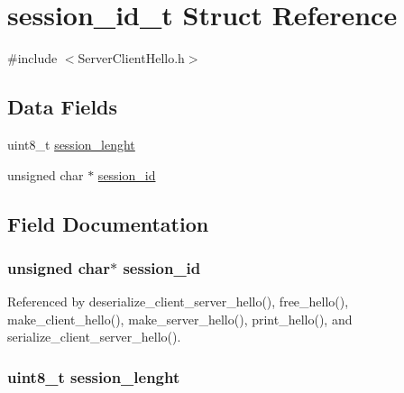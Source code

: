 \hypertarget{structsession__id__t}{}\section{session\+\_\+id\+\_\+t Struct Reference}
\label{structsession__id__t}


{\ttfamily \#include $<$Server\+Client\+Hello.\+h$>$}

\subsection*{Data Fields}
\begin{DoxyCompactItemize}
\item 
uint8\+\_\+t \hyperlink{structsession__id__t_a9215daa8dba2536b15b9029e18017c3a}{session\+\_\+lenght}
\item 
unsigned char $\ast$ \hyperlink{structsession__id__t_a16b10327d41aa891822609659111d1a1}{session\+\_\+id}
\end{DoxyCompactItemize}


\subsection{Field Documentation}
\subsubsection[{\texorpdfstring{session\+\_\+id}{session_id}}]{\setlength{\rightskip}{0pt plus 5cm}unsigned char$\ast$ session\+\_\+id}\hypertarget{structsession__id__t_a16b10327d41aa891822609659111d1a1}{}\label{structsession__id__t_a16b10327d41aa891822609659111d1a1}


Referenced by deserialize\+\_\+client\+\_\+server\+\_\+hello(), free\+\_\+hello(), make\+\_\+client\+\_\+hello(), make\+\_\+server\+\_\+hello(), print\+\_\+hello(), and serialize\+\_\+client\+\_\+server\+\_\+hello().

\subsubsection[{\texorpdfstring{session\+\_\+lenght}{session_lenght}}]{\setlength{\rightskip}{0pt plus 5cm}uint8\+\_\+t session\+\_\+lenght}\hypertarget{structsession__id__t_a9215daa8dba2536b15b9029e18017c3a}{}\label{structsession__id__t_a9215daa8dba2536b15b9029e18017c3a}


